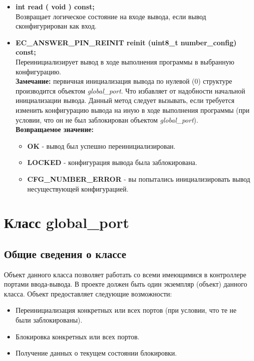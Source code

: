 \begin{itemize}
	\item \textbf{int		read	( void ) const;}\\Возвращает логическое состояние на входе вывода, если вывод сконфигурирован как вход.
	\item \textbf{EC\_ANSWER\_PIN\_REINIT	reinit	(uint8\_t number\_config) const;}\\Переинициализирует вывод в ходе выполнения программы в выбранную конфигурацию.\\\textbf{Замечание: }первичная инициализация вывода по нулевой (0) структуре производится объектом \textit{global\_port}. Что избавляет от надобности начальной инициализации вывода. Данный метод следует вызывать, если требуется изменить конфигурацию вывода на иную в ходе выполнения программы (при условии, что он не был заблокирован объектом \textit{global\_port}).\\\textbf{Возвращаемое значение:}
	\begin{itemize}
		\item \textbf{OK} - вывод был успешно переинициализирован.
		\item \textbf{LOCKED} - конфигурация вывода была заблокирована.
		\item \textbf{CFG\_NUMBER\_ERROR} - вы попытались инициализировать вывод несуществующей конфигурацией.
	\end{itemize}
\end{itemize}

\section{Класс global\_port}\label{class:global:port}
\subsection{Общие сведения о классе}
Объект данного класса позволяет работать со всеми имеющимися в контроллере портами ввода-вывода. В проекте должен быть один экземпляр (объект) данного класса. Объект предоставляет следующие возможности:
\begin{itemize}
	\item Переинициализация конкретных или всех портов (при условии, что те не были заблокированы).
	\item Блокировка конкретных или всех портов.
	\item Получение данных о текущем состоянии блокировки.
\end{itemize}


